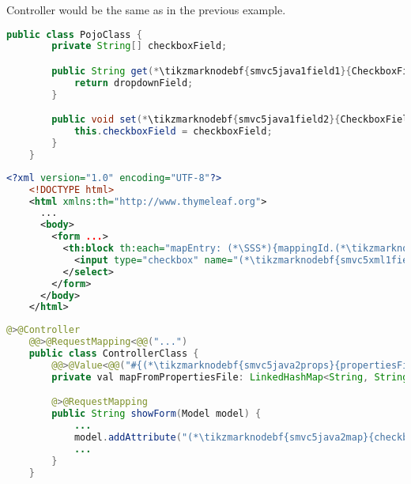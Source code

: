\notenonl Controller would be the same as in the previous example.
\newpage

\enlargethispage{10mm}
\begin{lstlisting}[language=Java, title={POJO class with one array field}]
    public class PojoClass {
        private String[] checkboxField;

        public String get(*\tikzmarknodebf{smvc5java1field1}{CheckboxField}*)() {
            return dropdownField;
        }

        public void set(*\tikzmarknodebf{smvc5java1field2}{CheckboxField}*)(String[] checkboxField) {
            this.checkboxField = checkboxField;
        }
    }
\end{lstlisting}
\begin{lstlisting}[language=XML, title={HTML form setting the field}]
    <?xml version="1.0" encoding="UTF-8"?>
    <!DOCTYPE html>
    <html xmlns:th="http://www.thymeleaf.org">
      ...
      <body>
        <form ...>
          <th:block th:each="mapEntry: (*\SSS*){mappingId.(*\tikzmarknodebf{smvc5xml1map}{checkboxMap}[ForestGreen]*).entrySet()}">
            <input type="checkbox" name="(*\tikzmarknodebf{smvc5xml1field}{checkboxField}[ForestGreen]*)" th:value="(*\SSS*){mapEntry.key}"><span th:text="(*\SSS*){mapEntry.value}"/><br/>
          </select>
        </form>
      </body>
    </html>
\end{lstlisting}
\begin{lstlisting}[language=Java, title={Controller converting \textit{properties} file to a map}]
    @>@Controller
    @@>@RequestMapping<@@("...")
    public class ControllerClass {
        @@>@Value<@@("#{(*\tikzmarknodebf{smvc5java2props}{propertiesFileId}[ForestGreen]*)}") // Parsing the properties file
        private val mapFromPropertiesFile: LinkedHashMap<String, String>;

        @>@RequestMapping
        public String showForm(Model model) {
            ...
            model.addAttribute("(*\tikzmarknodebf{smvc5java2map}{checkboxMap}[ForestGreen]*)", mapFromPropertiesFile)
            ...
        }
    }
\end{lstlisting}
\newpage

